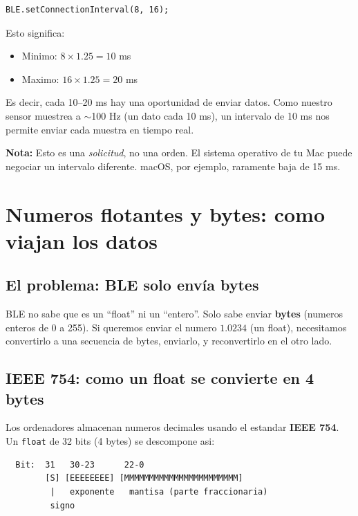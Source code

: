 \documentclass[11pt,a4paper]{article}
\begin{document}
\begin{lstlisting}[style=arduino]
BLE.setConnectionInterval(8, 16);
\end{lstlisting}

Esto significa:
\begin{itemize}
    \item Minimo: $8 \times 1.25 = 10$ ms
    \item Maximo: $16 \times 1.25 = 20$ ms
\end{itemize}

Es decir, cada 10--20 ms hay una oportunidad de enviar datos. Como
nuestro sensor muestrea a $\sim$100 Hz (un dato cada 10 ms), un
intervalo de 10 ms nos permite enviar cada muestra en tiempo real.

\textbf{Nota:} Esto es una \emph{solicitud}, no una orden. El
sistema operativo de tu Mac puede negociar un intervalo diferente.
macOS, por ejemplo, raramente baja de 15 ms.


\section{Numeros flotantes y bytes: como viajan los datos}

\subsection{El problema: BLE solo envía bytes}

BLE no sabe que es un ``float'' ni un ``entero''. Solo sabe enviar
\textbf{bytes} (numeros enteros de 0 a 255). Si queremos enviar el
numero $1.0234$ (un float), necesitamos convertirlo a una secuencia
de bytes, enviarlo, y reconvertirlo en el otro lado.

\subsection{IEEE 754: como un float se convierte en 4 bytes}

Los ordenadores almacenan numeros decimales usando el estandar
\textbf{IEEE 754}. Un \texttt{float} de 32 bits (4 bytes) se
descompone asi:

\begin{verbatim}
  Bit:  31   30-23      22-0
        [S] [EEEEEEEE] [MMMMMMMMMMMMMMMMMMMMMMM]
         |   exponente   mantisa (parte fraccionaria)
         signo
\end{verbatim}
\end{document}
